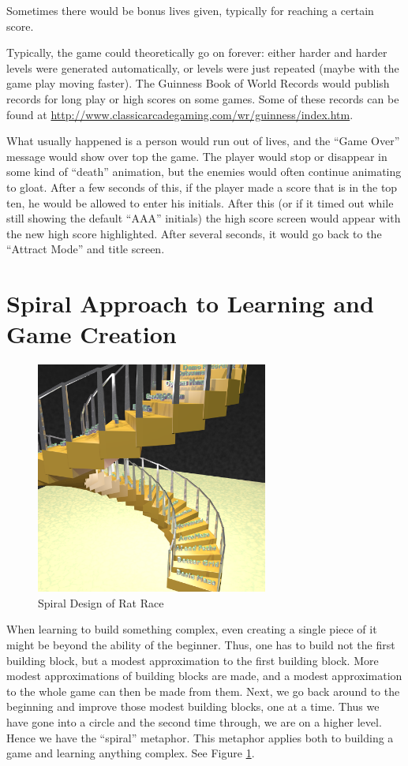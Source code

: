 \documentclass[12pt]{amsbook}
\theoremstyle{definition}
\theoremstyle{remark}
\numberwithin{figure}{chapter}
\numberwithin{table}{chapter}
\numberwithin{section}{chapter}
\numberwithin{equation}{section}
\begin{document}
Sometimes there would be bonus lives given, typically for reaching a certain score.

Typically, the game could theoretically go on forever: either harder and harder levels were generated automatically, or levels were just repeated (maybe with the game play moving faster).  The Guinness Book of World Records \cite{Mcw83} would publish records for long play or high scores on some games.  Some of these records can be found at \url{http://www.classicarcadegaming.com/wr/guinness/index.htm}. 

What usually happened is a person would run out of lives, and the ``Game Over'' message would show over top the game. The player would stop or disappear in some kind of ``death'' animation, but the enemies would often continue animating to gloat.  After a few seconds of this, if the player made a score that is in the top ten, he would be allowed to enter his initials.  After this (or if it timed out while still showing the default ``AAA'' initials) the high score screen would appear with the new high score highlighted.  After several seconds, it would go back to the ``Attract Mode'' and title screen.

\section{Spiral Approach to Learning and Game Creation}

\begin{figure}[h]
  \includegraphics[width=3in]{SpiralBlocks.png}
  \caption{Spiral Design of Rat Race}
  \label{fig:spiral}
\end{figure}

When learning to build something complex, even creating a single piece of it might be beyond the ability of the beginner.  Thus, one has to build not the first building block, but a modest approximation to the first building block.  More modest approximations of building blocks are made, and a modest approximation to the whole game can then be made from them.  Next, we go back around to the beginning and improve those modest building blocks, one at a time.  Thus we have gone into a circle and the second time through, we are on a higher level.  Hence we have the “spiral” metaphor.  This metaphor applies both to building a game and learning anything complex.  See Figure \ref{fig:spiral}.
\end{document}
